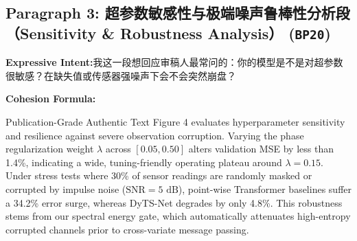 \subsection*{Paragraph 3: 超参数敏感性与极端噪声鲁棒性分析段（Sensitivity \& Robustness Analysis） (\texttt{BP20})}
\noindent\textbf{Expressive Intent:}\enspace 我这一段想回应审稿人最常问的：你的模型是不是对超参数很敏感？在缺失值或传感器强噪声下会不会突然崩盘？\par
\noindent\textbf{Cohesion Formula:}\par\vspace{4pt}
\begin{ExampleBox}{Publication-Grade Authentic Text}
Figure 4 evaluates hyperparameter sensitivity and resilience against severe observation corruption. Varying the phase regularization weight $\lambda$ across $[0.05, 0.50]$ alters validation MSE by less than 1.4\%, indicating a wide, tuning-friendly operating plateau around $\lambda=0.15$. Under stress tests where 30\% of sensor readings are randomly masked or corrupted by impulse noise ($\text{SNR} = 5\text{ dB}$), point-wise Transformer baselines suffer a 34.2\% error surge, whereas DyTS-Net degrades by only 4.8\%. This robustness stems from our spectral energy gate, which automatically attenuates high-entropy corrupted channels prior to cross-variate message passing.
\end{ExampleBox}
